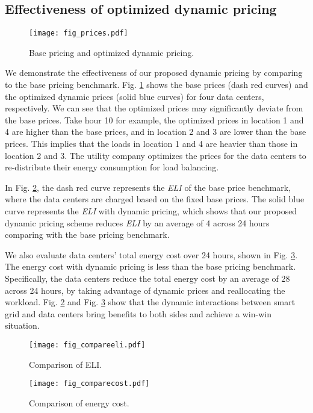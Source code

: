 \documentclass[journal]{IEEEtran}
\begin{document}
	\subsection{Effectiveness of optimized dynamic pricing}
	\begin{figure}[tbhp]
		\vspace{-2mm}
		\centering
		\texttt{[image: fig\_prices.pdf]}
		\caption{\label{fig_prices}Base pricing and optimized dynamic pricing.}
		\vspace{-2mm}
	\end{figure}
	We demonstrate the effectiveness of our proposed dynamic pricing by comparing to the base pricing benchmark. Fig. \ref{fig_prices} shows the base prices (dash red curves) and the optimized dynamic prices (solid blue curves) for four data centers, respectively. We can see that the optimized prices may significantly deviate from the base prices. Take hour 10 for example, the optimized prices in location 1 and 4 are higher than the base prices, and in location 2 and 3 are lower than the base prices. This implies that the loads in location 1 and 4 are heavier than those in location 2 and 3. The utility company optimizes the prices for the data centers to re-distribute their energy consumption for load balancing.
	
	
	In Fig. \ref{fig_compareeli}, the dash red curve represents the \emph{ELI} of the base price benchmark, where the data centers are charged based on the fixed base prices. The solid blue curve represents the \emph{ELI} with dynamic pricing, which shows that our proposed dynamic pricing scheme reduces \emph{ELI} by an average of 4 across 24 hours comparing with the base pricing benchmark.
	
	We also evaluate data centers' total energy cost over 24 hours, shown in Fig. \ref{fig_comparecost}. The energy cost with dynamic pricing is less than the base pricing benchmark. Specifically, the data centers reduce the total energy cost by an average of 28 across 24 hours, by taking advantage of dynamic prices and reallocating the workload. Fig. \ref{fig_compareeli} and Fig. \ref{fig_comparecost} show that the dynamic interactions between smart grid and data centers bring benefits to both sides and achieve a win-win situation.
	\begin{figure}[tbhp]
		\vspace{-2mm}
		\centering
		\texttt{[image: fig\_compareeli.pdf]}
		\caption{\label{fig_compareeli}Comparison of ELI.}
		\vspace{-4mm}
	\end{figure}
	\begin{figure}[tbhp]
		\vspace{-2mm}
		\centering
		\texttt{[image: fig\_comparecost.pdf]}
		\caption{\label{fig_comparecost}Comparison of energy cost.}
		\vspace{-4mm}
	\end{figure}
	
\end{document}
